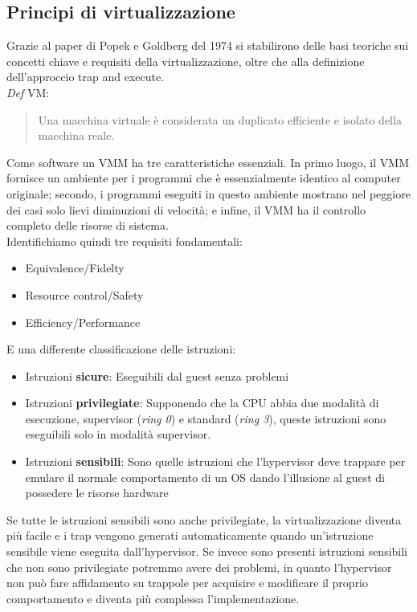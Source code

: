 \documentclass{article}
\begin{document}
		\subsection{Principi di virtualizzazione}
		Grazie al paper di Popek e Goldberg del 1974 si stabilirono delle basi teoriche sui concetti chiave e requisiti della virtualizzazione, oltre che alla definizione dell'approccio trap and execute.\\
		\emph{Def} VM: 
		\begin{quote}
			Una macchina virtuale è considerata un duplicato efficiente e isolato della macchina reale.
		\end{quote}
		Come software un VMM ha tre caratteristiche essenziali. In primo luogo, il VMM fornisce un ambiente per i programmi che è essenzialmente identico al computer originale; secondo, i programmi eseguiti in questo ambiente mostrano nel peggiore dei casi solo lievi diminuzioni di velocità; e infine, il VMM ha il controllo completo delle risorse di sistema.\\
		
		Identifichiamo quindi tre requisiti fondamentali:
		\begin{itemize}
			\item Equivalence/Fidelty
			\item Resource control/Safety
			\item Efficiency/Performance
		\end{itemize}
		E una differente classificazione delle istruzioni:
		\begin{itemize}
		    \item Istruzioni \textbf{sicure}: Eseguibili dal guest senza problemi
		    \item Istruzioni \textbf{privilegiate}: Supponendo che la CPU abbia due modalità di esecuzione, supervisor (\textit{ring 0}) e standard (\textit{ring 3}), queste istruzioni sono eseguibili solo in modalità supervisor.
		    \item Istruzioni \textbf{sensibili}: Sono quelle istruzioni che l'hypervisor deve trappare per emulare il normale comportamento di un OS dando l'illusione al guest di possedere le risorse hardware
		\end{itemize}
		Se tutte le istruzioni sensibili sono anche privilegiate, la virtualizzazione diventa più facile e i trap vengono generati automaticamente quando un'istruzione sensibile viene eseguita dall'hypervisor. Se invece sono presenti istruzioni sensibili che non sono privilegiate potremmo avere dei problemi, in quanto l'hypervisor non può fare affidamento su trappole per acquisire e modificare il proprio comportamento e diventa più complessa l'implementazione. 
		
\end{document}

